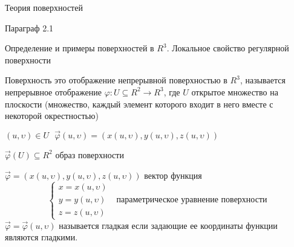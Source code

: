 \begin{title}
  Теория поверхностей
\end{title}

\begin{title}[\Large]
  Параграф 2.1
\end{title}

\begin{title}[\Large]
  Определение и примеры поверхностей в $R^3$. Локальное свойство регулярной
  поверхности
\end{title}

\begin{define}[поверхности]
  Поверхность это отображение непрерывной поверхностью в $R^3$, называется
  непрерывное отображение $\varphi: U \subseteq R^2 \to R^3$, где
  $U$ открытое множество на плоскости (множество, каждый элемент которого входит
  в него вместе с некоторой окрестностью)

  $(u, \upsilon) \in U ~~~ \vec \varphi(u, \upsilon) = (x(u, \upsilon),
  y(u, \upsilon), z(u, \upsilon))$

  $\vec \varphi (U) \subseteq R^2$ образ поверхности

  $\vec \varphi = (x(u, \upsilon), y(u, \upsilon), z(u, \upsilon))$ вектор
  функция
  $$
  \left\{
  \begin{array}{c}
    x = x(u, \upsilon) \\
    y = y(u, \upsilon) \\
    z = z(u, \upsilon)
  \end{array}
  \right. ~~~ \text{параметрическое уравнение поверхности}
  $$
  $\vec \varphi = \vec \varphi(u, \upsilon)$ называется гладкая если
  задающие ее координаты функции являются гладкими.
\end{define}

